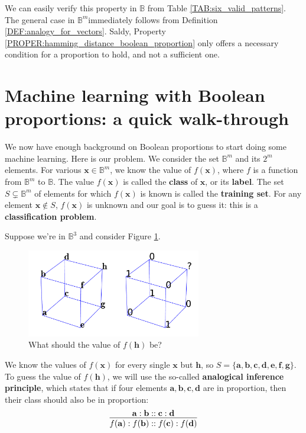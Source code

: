 We can easily verify this property in $\mathbb{B}$ from Table
\ref{TAB:six_valid_patterns}. The general case in $\mathbb{B}^m $immediately
follows from Definition \ref{DEF:analogy_for_vectors}. Saldy, Property
\ref{PROPER:hamming_distance_boolean_proportion} only offers a necessary
condition for a proportion to hold, and not a sufficient one.

\section{Machine learning with Boolean proportions: a quick walk-through}
\label{SEC:machine_learning_with_boolean_proportions}

We now have enough background on Boolean proportions to start doing some machine
learning. Here is our problem. We consider the set $\mathbb{B}^m$ and its $2^m$
elements. For various $\mathbf{x} \in \mathbb{B}^m$, we know the value of
$f(\mathbf{x})$, where $f$ is a function from $\mathbb{B}^m$ to $\mathbb{B}$.
The value $f(\mathbf{x})$ is called the \textbf{class} of $\mathbf{x}$, or its
\textbf{label}. The set $S \subsetneq \mathbb{B}^m$ of elements for which
$f(\mathbf{x})$ is known is called the \textbf{training set}. For any element
$\mathbf{x} \notin S$, $f(\mathbf{x})$ is unknown and our goal is to guess it:
this is a \textbf{classification problem}.

Suppose we're in $\mathbb{B}^3$ and consider Figure
\ref{FIG:classification_problem}.
\begin{figure}[!h]
\centering
  \includegraphics[width=3in]{figures/classification_problem.pdf}
  \caption{What should the value of $f(\mathbf{h})$ be?}
\label{FIG:classification_problem}
\end{figure}
We know the values of $f(\mathbf{x})$ for
every single $\mathbf{x}$ but $\mathbf{h}$, so $S = \{ \mathbf{a}, \mathbf{b},
\mathbf{c}, \mathbf{d}, \mathbf{e}, \mathbf{f}, \mathbf{g}\}$. To guess the
value of $f(\mathbf{h})$, we will use the so-called \textbf{analogical
inference principle}, which states that if four elements $\mathbf{a},
\mathbf{b}, \mathbf{c}, \mathbf{d}$ are in proportion, then their class should
also be in proportion:
$$
\infer{f(\mathbf{a}) : f(\mathbf{b}) :: f(\mathbf{c})
: f(\mathbf{d})}{\mathbf{a} : \mathbf{b} :: \mathbf{c} : \mathbf{d}}
$$

